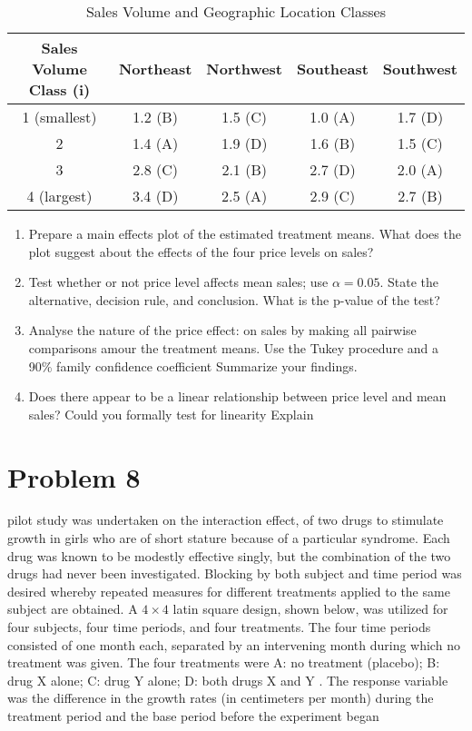 \documentclass{article}
\begin{document}
\begin{table}[h!]
	\centering
	\caption{Sales Volume and Geographic Location Classes}
	\begin{tabular}{c c c c c}
		\hline
		\textbf{Sales Volume Class (i)} & \textbf{Northeast} & \textbf{Northwest} & \textbf{Southeast} & \textbf{Southwest} \\
		\hline
		1 (smallest)                    & 1.2 (B)            & 1.5 (C)            & 1.0 (A)            & 1.7 (D)            \\
		2                               & 1.4 (A)            & 1.9 (D)            & 1.6 (B)            & 1.5 (C)            \\
		3                               & 2.8 (C)            & 2.1 (B)            & 2.7 (D)            & 2.0 (A)            \\
		4 (largest)                     & 3.4 (D)            & 2.5 (A)            & 2.9 (C)            & 2.7 (B)            \\
		\hline
	\end{tabular}
\end{table}


\begin{enumerate}
	\item Prepare a main effects plot of the estimated treatment means. What does the plot suggest about the effects of the
	      four price levels on sales?
	\item Test whether or not price level affects mean sales; use $\alpha = 0.05$. State the alternative,
	      decision rule, and conclusion. What is the p-value of the test?
	\item Analyse the nature of the price effect: on sales by making all pairwise comparisons amour the treatment means.
	      Use the Tukey procedure and a 90\% family confidence coefficient Summarize your findings.
	\item Does there appear to be a linear relationship between price level and mean sales? Could you formally test for linearity
	      Explain
\end{enumerate}

\section{Problem 8}
pilot study was undertaken on the interaction effect, of two drugs to stimulate growth in girls
who are of short stature because of a particular syndrome. Each drug was known to be modestly
effective singly, but the combination of the two drugs had never been investigated. Blocking by both
subject and time period was desired whereby repeated measures for different treatments applied
to the same subject are obtained. A $4 \times 4$ latin square design, shown below, was utilized for four
subjects, four time periods, and four treatments. The four time periods consisted of one month
each, separated by an intervening month during which no treatment was given. The four treatments
were A: no treatment (placebo); B: drug X alone; C: drug Y alone; D: both drugs X and Y .
The response variable was the difference in the growth rates (in centimeters per month) during the
treatment period and the base period before the experiment began
\end{document}
